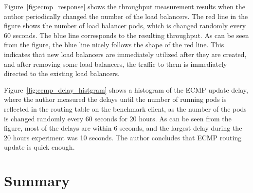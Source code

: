 Figure~\ref{fig:ecmp_response} shows the throughput measurement results when the author periodically changed the number of the load balancers. 
The red line in the figure shows the number of  load balancer pods, which is changed randomly every 60 seconds.
The blue line corresponds to the resulting throughput.
As can be seen from the figure, the blue line nicely follows the shape of the red line.
This indicates that new load balancers are immediately utilized after they are created, and after removing some load balancers, the traffic to them is immediately directed to the existing load balancers.

Figure~\ref{fig:ecmp_delay_histgram} shows a histogram of the ECMP update delay, where the author measured the delays until the number of running  pods is reflected in the routing table on the benchmark client, as the number of the  pods is changed randomly every 60 seconds for 20 hours.
As can be seen from the figure, most of the delays are within 6 seconds, and the largest delay during the 20 hours experiment was 10 seconds.
The author concludes that  ECMP routing update is quick enough.

\FloatBarrier

\section{Summary}\label{Conclusions}

